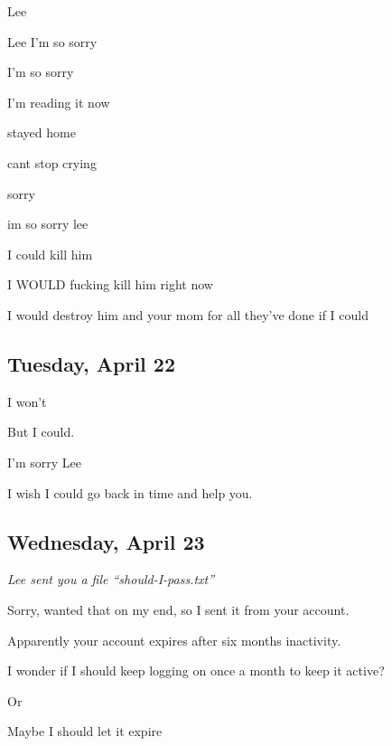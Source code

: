 {
Lee

Lee I'm so sorry

I'm so sorry

I'm reading it now

stayed home

cant stop crying

sorry

im so sorry lee

I could kill him

I WOULD fucking kill him right now

I would destroy him and your mom for
all they've done if I could

\newpage

\subsection*{Tuesday, April 22}\label{tuesday-april-22}

I won't

But I could.

I'm sorry Lee

I wish I could go back in time and
help you.

\newpage

\subsection*{Wednesday, April 23}\label{wednesday-april-23}

\emph{Lee sent you a file ``should-I-pass.txt''}

Sorry, wanted that on my end, so I
sent it from your account.

Apparently your account expires
after six months inactivity.

I wonder if I should keep logging on
once a month to keep it active?

Or

Maybe I should let it expire

}
